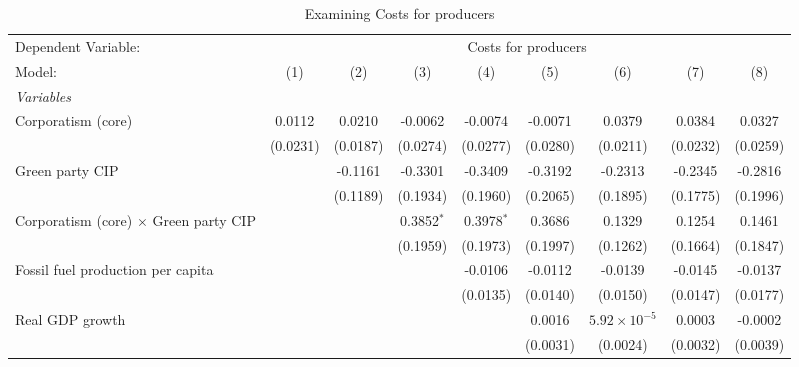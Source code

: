 
\begin{table}[htbp]
   \caption{Examining Costs for producers}
   \centering
   \begin{tabular}{lcccccccc}
      \tabularnewline \midrule \midrule
      Dependent Variable: & \multicolumn{8}{c}{Costs for producers}\\
      Model:                                       & (1)      & (2)      & (3)          & (4)          & (5)      & (6)                   & (7)      & (8)\\  
      \midrule
      \emph{Variables}\\
      Corporatism (core)                           & 0.0112   & 0.0210   & -0.0062      & -0.0074      & -0.0071  & 0.0379                & 0.0384   & 0.0327\\   
                                                   & (0.0231) & (0.0187) & (0.0274)     & (0.0277)     & (0.0280) & (0.0211)              & (0.0232) & (0.0259)\\   
      Green party CIP                              &          & -0.1161  & -0.3301      & -0.3409      & -0.3192  & -0.2313               & -0.2345  & -0.2816\\   
                                                   &          & (0.1189) & (0.1934)     & (0.1960)     & (0.2065) & (0.1895)              & (0.1775) & (0.1996)\\   
      Corporatism (core) $\times$ Green party CIP  &          &          & 0.3852$^{*}$ & 0.3978$^{*}$ & 0.3686   & 0.1329                & 0.1254   & 0.1461\\   
                                                   &          &          & (0.1959)     & (0.1973)     & (0.1997) & (0.1262)              & (0.1664) & (0.1847)\\   
      Fossil fuel production per capita            &          &          &              & -0.0106      & -0.0112  & -0.0139               & -0.0145  & -0.0137\\   
                                                   &          &          &              & (0.0135)     & (0.0140) & (0.0150)              & (0.0147) & (0.0177)\\   
      Real GDP growth                              &          &          &              &              & 0.0016   & $5.92\times 10^{-5}$  & 0.0003   & -0.0002\\   
                                                   &          &          &              &              & (0.0031) & (0.0024)              & (0.0032) & (0.0039)\\   

\end{tabular}
\end{table}
